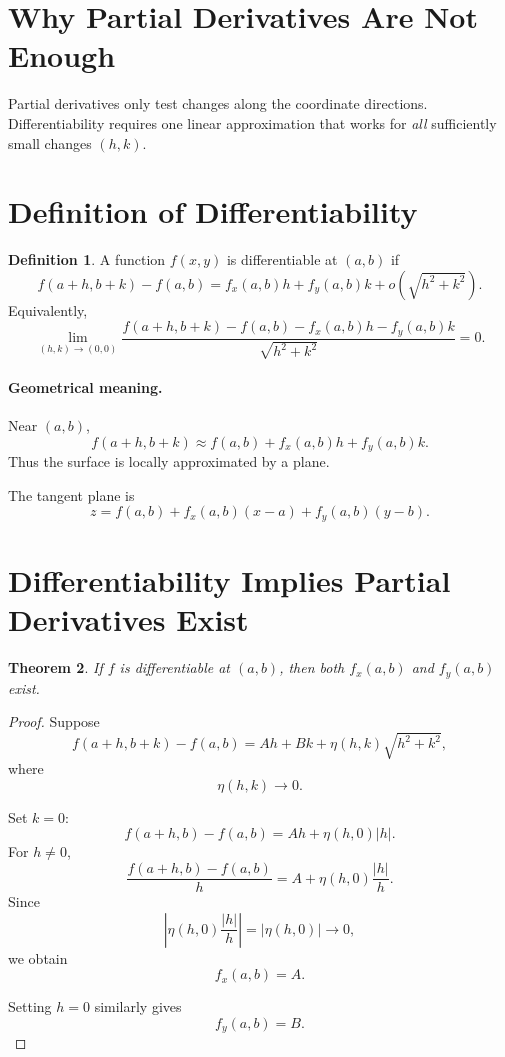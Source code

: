 \documentclass[11pt,oneside]{book}
\theoremstyle{studentthm}
\newtheorem{theorem}{Theorem}[chapter]
\theoremstyle{definition}
\newtheorem{definition}[theorem]{Definition}
\newcommand{\abs}[1]{\left|#1\right|}
\begin{document}
\section*{Why Partial Derivatives Are Not Enough}

Partial derivatives only test changes along the coordinate directions.
Differentiability requires one linear approximation that works for
\emph{all} sufficiently small changes \((h,k)\).

\section{Definition of Differentiability}

\begin{definition}
A function \(f(x,y)\) is differentiable at \((a,b)\) if
\[
f(a+h,b+k)-f(a,b)
=
f_x(a,b)h+f_y(a,b)k
+
o\!\left(\sqrt{h^2+k^2}\right).
\]
Equivalently,
\[
\lim_{(h,k)\to(0,0)}
\frac{
f(a+h,b+k)-f(a,b)
-f_x(a,b)h-f_y(a,b)k
}{
\sqrt{h^2+k^2}
}
=0.
\]
\end{definition}

\paragraph{Geometrical meaning.}
Near \((a,b)\),
\[
f(a+h,b+k)
\approx
f(a,b)+f_x(a,b)h+f_y(a,b)k.
\]
Thus the surface is locally approximated by a plane.

The tangent plane is
\[
z
=
f(a,b)
+
f_x(a,b)(x-a)
+
f_y(a,b)(y-b).
\]

\section{Differentiability Implies Partial Derivatives Exist}

\begin{theorem}
If \(f\) is differentiable at \((a,b)\), then both \(f_x(a,b)\) and
\(f_y(a,b)\) exist.
\end{theorem}

\begin{proof}
Suppose
\[
f(a+h,b+k)-f(a,b)
=
Ah+Bk+\eta(h,k)\sqrt{h^2+k^2},
\]
where
\[
\eta(h,k)\to0.
\]

Set \(k=0\):
\[
f(a+h,b)-f(a,b)
=
Ah+\eta(h,0)\abs{h}.
\]
For \(h\ne0\),
\[
\frac{f(a+h,b)-f(a,b)}{h}
=
A+\eta(h,0)\frac{\abs h}{h}.
\]
Since
\[
\left|
\eta(h,0)\frac{\abs h}{h}
\right|
=
\abs{\eta(h,0)}
\to0,
\]
we obtain
\[
f_x(a,b)=A.
\]

Setting \(h=0\) similarly gives
\[
f_y(a,b)=B.
\]
\end{proof}
\end{document}
